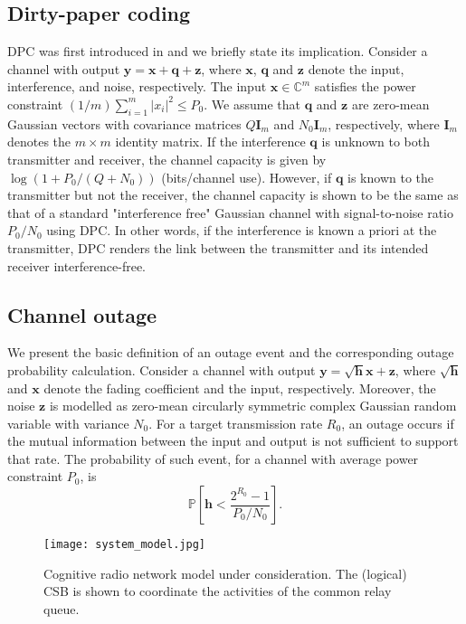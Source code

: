 \documentclass[journal,twocolumn]{IEEEtran}
\begin{document}
\subsection{Dirty-paper coding}
\label{dpc}
DPC was first introduced in \cite{DPC} and we briefly state its implication. Consider a channel with output $\mathbf{y}=\mathbf{x}+\mathbf{q}+\mathbf{z}$, where $\mathbf{x}$, $\mathbf{q}$ and $\mathbf{z}$ denote the input, interference, and noise, respectively. The input $\mathbf{x} \in \mathbb{C}^{m}$ satisfies the power constraint $(1/m)\sum_{i=1}^{m}|x_{i}|^{2} \leq
P_{0}$. We assume that $\mathbf{q}$ and $\mathbf{z}$ are zero-mean Gaussian vectors with covariance matrices $Q\mathbf{I}_{m}$ and
$N_{0}\mathbf{I}_{m}$, respectively, where $\mathbf{I}_{m}$ denotes the $m \times m$ identity matrix. If the interference $\mathbf{q}$ is unknown to both transmitter and receiver, the channel capacity is given by $\log(1+P_{0}/(Q+N_{0}))$ (bits/channel use).
However, if $\mathbf{q}$ is known to the transmitter but not the receiver, the channel capacity is shown to be the same as that of a standard "interference free" Gaussian channel with signal-to-noise ratio $P_{0}/N_{0}$ using DPC.
In other words, if the interference is known a priori at the transmitter, DPC renders the link between the transmitter and its intended receiver interference-free.

\subsection{Channel outage}\label{Channel_Outage}
We present the basic definition of an outage event and the corresponding outage probability calculation. Consider a channel with output
$\mathbf{y}=\sqrt{\mathbf{h}}\mathbf{x}+\mathbf{z}$, where $\sqrt{\mathbf{h}}$ and $\mathbf{x}$ denote the fading coefficient and the input, respectively. Moreover, the noise $\mathbf{z}$ is modelled as zero-mean circularly symmetric complex Gaussian random variable with variance $N_{0}$. For a target transmission rate $R_{0}$, an outage occurs if the mutual information between the input and output is not sufficient to support that rate. The probability of such event, for a channel with average power constraint $P_{0}$, is
\begin{equation}
\mathbb{P} \left[ \mathbf{h} < \frac{2^{R_{0}}-1}{P_{0}/N_{0}} \right].
\label{outage}
\end{equation}

\begin{figure}[t]
\begin{center}
\texttt{[image: system\_model.jpg]}
\caption{Cognitive radio network model under consideration. The (logical) CSB is shown to coordinate the activities of the common relay queue.} \label{Fig1}
\end{center}
\end{figure}
\end{document}
